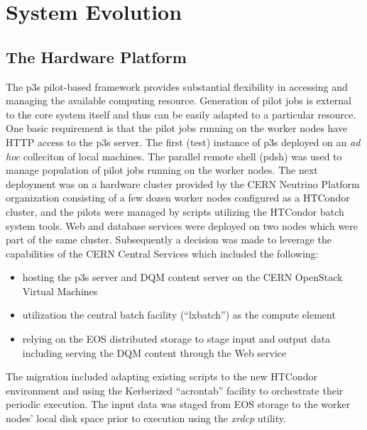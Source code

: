 \documentclass{webofc}
\begin{document}
\section{System Evolution}

\subsection{The Hardware Platform}
\label{sec:hardware}

The p3s pilot-based framework provides substantial flexibility in accessing and
managing the available computing resource. Generation of pilot jobs is external
to the core system itself and thus can be easily adapted to a particular resource.
One basic requirement is that the pilot jobs running on the worker nodes have
HTTP access to the p3s server. The first (test) instance of p3s deployed
on an \textit{ad hoc} colleciton of local machines. The parallel remote shell
(pdsh) was used to manage population of pilot jobs running on the worker nodes.
The next deployment was on a hardware cluster provided by the CERN
Neutrino Platform organization \cite{platform} consisting of a few dozen
worker nodes configured as a HTCondor cluster, and the pilots were managed
by scripts utilizing the HTCondor batch system tools. Web and database
services were deployed on two nodes which were part of the same cluster.
Subsequently a decision was made to leverage the capabilities of the CERN
Central Services which included the following:

\begin{itemize}

\item hosting the p3s server and DQM content server on the CERN OpenStack
Virtual Machines

\item utilization  the central batch facility (``lxbatch'') as the compute element

\item relying on the EOS distributed storage to stage input and output data
including serving the DQM content through the Web service

\end{itemize}

\noindent The migration included adapting existing scripts to the new HTCondor
environment and using the Kerberized ``acrontab'' facility to orchestrate their
periodic execution. The input data was staged from EOS storage to the worker
nodes' local disk space prior to execution using the \textit{xrdcp} utility.
\end{document}
